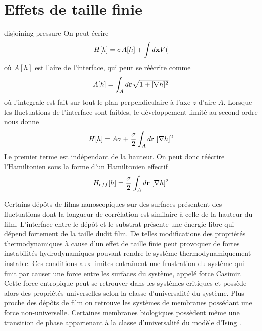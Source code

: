 \chapter{Effets de taille finie}
    \label{chap-sos}

disjoining pressure
\cite{bergeron_forces_1999}
\cite{stubenrauch_disjoining_2003}
On peut écrire
\begin{equation}
    H[h] = \sigma A[h] + \int d{\bf x} V(
\end{equation}
où $A[h]$ est l'aire de l'interface, qui peut se réécrire comme
\begin{equation}
    A[h] = \int_A d {\bf r}\sqrt{1+[\nabla h]^2}
\end{equation}
où l'integrale est fait sur tout le plan perpendiculaire à l'axe $z$ d'aire $A$. Lorsque les fluctuations de l'interface sont faibles, le développement limité au second ordre nous donne
\begin{equation}
    H[h]= A\sigma +\frac{\sigma}{2} \int_A d {\bf r} \ [\nabla h]^2
\end{equation}
Le premier terme est indépendant de la hauteur. On peut donc réécrire l'Hamiltonien sous la forme d'un Hamiltonien effectif
\begin{equation}
    H_{eff} [h]= \frac{\sigma}{2} \int_A d {\bf r}\  [\nabla h]^2
    \label{heff}
\end{equation}



Certains dépôts de films nanoscopiques sur des surfaces présentent des fluctuations dont la longueur de corrélation est similaire à celle de la hauteur du film. L'interface entre le dépôt et le substrat présente une énergie libre qui dépend fortement de la taille dudit film\cite{ouyang_size-dependent_2006,jiang_size_2008}. De telles modifications des propriétés thermodynamiques à cause d'un effet de taille finie peut provoquer de fortes instabilités hydrodynamiques pouvant rendre le système thermodynamiquement instable\cite{ding_theoretical_2001}. Ces conditions aux limites entraînent une frustration du système qui finit par causer une force entre les surfaces du système, appelé force Casimir. Cette force entropique peut se retrouver dans les systèmes critiques et possède alors des propriétés universelles selon la classe d'universalité du système. Plus proche des dépôts de film on retrouve les systèmes de membranes\cite{nelson_statistical_2004} possédant une force non-universelle\cite{hasnaoui_casimir_2010}. Certaines membranes biologiques possèdent même une transition de phase appartenant à la classe d'universalité du modèle d'Ising \cite{machta_critical_2012}.

